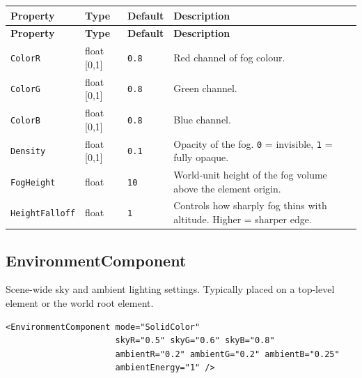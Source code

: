 \documentclass[11pt,a4paper]{article}
\begin{document}
\begin{longtable}{P{3.2cm} P{2cm} P{2.5cm} P{5.3cm}}
  \toprule
  \textbf{Property} & \textbf{Type} & \textbf{Default} & \textbf{Description} \\
  \midrule
  \endfirsthead
  \toprule
  \textbf{Property} & \textbf{Type} & \textbf{Default} & \textbf{Description} \\
  \midrule
  \endhead
  \texttt{ColorR} & float [0,1] & \texttt{0.8} & Red channel of fog colour. \\
  \texttt{ColorG} & float [0,1] & \texttt{0.8} & Green channel. \\
  \texttt{ColorB} & float [0,1] & \texttt{0.8} & Blue channel. \\
  \texttt{Density} & float [0,1] & \texttt{0.1} &
    Opacity of the fog. \texttt{0} = invisible, \texttt{1} = fully opaque. \\
  \texttt{FogHeight} & float & \texttt{10} &
    World-unit height of the fog volume above the element origin. \\
  \texttt{HeightFalloff} & float & \texttt{1} &
    Controls how sharply fog thins with altitude. Higher = sharper edge. \\
  \bottomrule
\end{longtable}

\subsection{EnvironmentComponent}

Scene-wide sky and ambient lighting settings. Typically placed on a top-level
element or the world root element.

\begin{lstlisting}
<EnvironmentComponent mode="SolidColor"
                      skyR="0.5" skyG="0.6" skyB="0.8"
                      ambientR="0.2" ambientG="0.2" ambientB="0.25"
                      ambientEnergy="1" />
\end{lstlisting}
\end{document}
